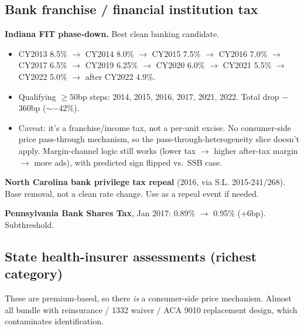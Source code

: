 \subsection*{Bank franchise / financial institution tax}

\textbf{Indiana FIT phase-down.} Best clean banking
candidate.
\begin{itemize}
  \item CY2013 8.5\% $\to$ CY2014 8.0\% $\to$ CY2015 7.5\%
        $\to$ CY2016 7.0\% $\to$ CY2017 6.5\% $\to$ CY2019
        6.25\% $\to$ CY2020 6.0\% $\to$ CY2021 5.5\% $\to$
        CY2022 5.0\% $\to$ after CY2022 4.9\%.
  \item Qualifying $\geq$50bp steps: 2014, 2015, 2016, 2017,
        2021, 2022. Total drop $-$360bp ($\sim$$-$42\%).
  \item Caveat: it's a franchise/income tax, not a per-unit
        excise. No consumer-side price pass-through
        mechanism, so the pass-through-heterogeneity slice
        doesn't apply. Margin-channel logic still works
        (lower tax $\to$ higher after-tax margin $\to$ more
        ads), with predicted sign flipped vs.\ SSB case.
\end{itemize}

\textbf{North Carolina bank privilege tax repeal} (2016, via
S.L. 2015-241/268). Base removal, not a clean rate change.
Use as a repeal event if needed.

\textbf{Pennsylvania Bank Shares Tax}, Jan 2017: 0.89\%
$\to$ 0.95\% (+6bp). Subthreshold.

\subsection*{State health-insurer assessments (richest
  category)}

These are premium-based, so there \emph{is} a consumer-side
price mechanism. Almost all bundle with reinsurance / 1332
waiver / ACA 9010 replacement design, which contaminates
identification.

